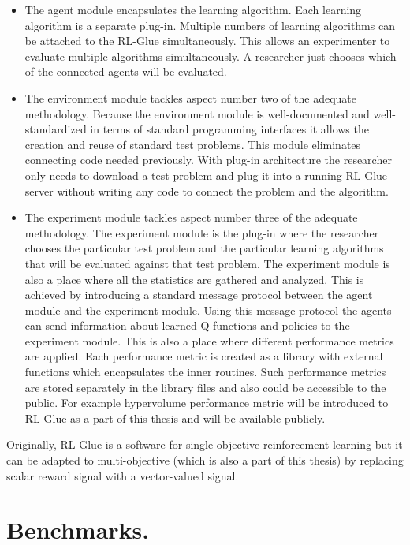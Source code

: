 {{\begin{itemize}

\item The agent module encapsulates the learning algorithm. Each learning algorithm is a separate plug-in. Multiple numbers of learning algorithms can be attached to the RL-Glue simultaneously. This allows an experimenter to evaluate multiple algorithms simultaneously. A researcher just chooses which of the connected agents will be evaluated.

\item The environment module tackles aspect number two of the adequate methodology. Because the environment module is well-documented and well-standardized in terms of standard programming interfaces it allows the creation and reuse of standard test problems. This module eliminates connecting code needed previously. With plug-in architecture the researcher only needs to download a test problem and plug it into a running RL-Glue server without writing any code to connect the problem and the algorithm.

\item The experiment module tackles aspect number three of the adequate methodology. The experiment module is the plug-in where the researcher chooses the particular test problem and the particular learning algorithms that will be evaluated against that test problem. The experiment module is also a place where all the statistics are gathered and analyzed. This is achieved by introducing a standard message protocol between the agent module and the experiment module. Using this message protocol the agents can send information about learned Q-functions and policies to the experiment module. This is also a place where different performance metrics are applied. Each performance metric is created as a library with external functions which encapsulates the inner routines. Such performance metrics are stored separately in the library files and also could be accessible to the public. For example hypervolume performance metric will be introduced to RL-Glue as a part of this thesis and will be available publicly.

\end{itemize}

Originally, RL-Glue is a software for single objective reinforcement learning but it can be adapted to multi-objective (which is also a part of this thesis) by replacing scalar reward signal with a vector-valued signal.

\section{Benchmarks.}

}}
